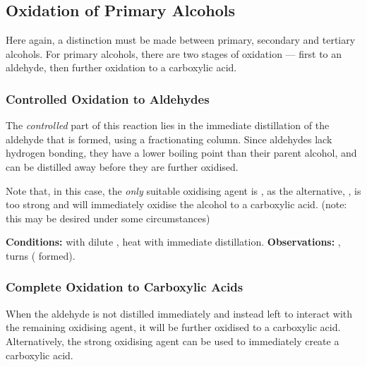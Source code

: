 		\subsection{Oxidation of Primary Alcohols}

			Here again, a distinction must be made between primary, secondary and tertiary alcohols. For primary alcohols, there
			are two stages of oxidation –– first to an aldehyde, then further oxidation to a carboxylic acid.

			\hypertarget{OxidationOfPrimaryAlcohols}{}
			\subsubsection{Controlled Oxidation to Aldehydes}

				The \textit{controlled} part of this reaction lies in the immediate distillation of the aldehyde that is formed, using
				a fractionating column. Since aldehydes lack hydrogen bonding, they have a lower boiling point than their parent alcohol,
				and can be distilled away before they are further oxidised.

				Note that, in this case, the \textit{only} suitable oxidising agent is , as the alternative, , is
				too strong and will immediately oxidise the alcohol to a carboxylic acid. (note: this may be desired under some circumstances)


				\vspace{1.5em}
				\vbox{\textbf{Conditions:}	\tabto{35mm} with dilute ,
											\tabto{35mm}heat with immediate distillation.}
				\vspace{0.75em}
				\vbox{\textbf{Observations:}\tabto{35mm} , turns 
														( formed).}




			\pagebreak
			\hypertarget{CompleteOxidationOfPrimaryAlcohols}{}
			\subsubsection{Complete Oxidation to Carboxylic Acids}

				When the aldehyde is not distilled immediately and instead left to interact with the remaining oxidising agent, it will
				be further oxidised to a carboxylic acid. Alternatively, the strong oxidising agent  can be used to immediately
				create a carboxylic acid.

